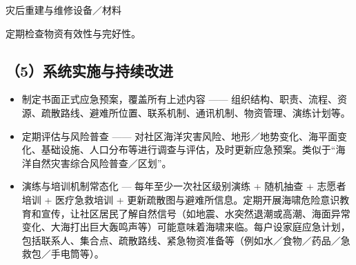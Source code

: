 灾后重建与维修设备／材料

定期检查物资有效性与完好性。

\subsection{（5）系统实施与持续改进}\label{ux7cfbux7edfux5b9eux65bdux4e0eux6301ux7eedux6539ux8fdb}

\begin{itemize}
\item
  制定书面正式应急预案，覆盖所有上述内容 ------ 组织结构、职责、流程、资源、疏散路线、避难所位置、联系机制、通讯机制、物资管理、演练计划等。
\item
  定期评估与风险普查 ------ 对社区海洋灾害风险、地形／地势变化、海平面变化、基础设施、人口分布等进行调查与评估，及时更新应急预案。类似于``海洋自然灾害综合风险普查／区划''。
\item
  演练与培训机制常态化 --- 每年至少一次社区级别演练 + 随机抽查 + 志愿者培训 + 医疗急救培训 + 更新疏散图与避难所信息。定期开展海啸危险意识教育和宣传，让社区居民了解自然信号（如地震、水突然退潮或高潮、海面异常变化、大海打出巨大轰鸣声等）可能意味着海啸来临。每户设家庭应急计划，包括联系人、集合点、疏散路线、紧急物资准备等（例如水／食物／药品／急救包／手电筒等）。
\end{itemize}
